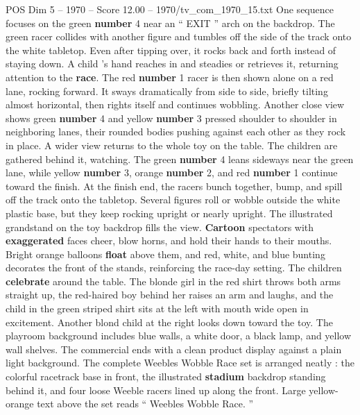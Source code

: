 \begin{textsample}{POS Dim 5 – 1970 – Score 12.00 – 1970/tv\_com\_1970\_15.txt}
One sequence focuses on the green \textbf{number} 4 near an “ EXIT ” arch on the backdrop.
The green racer collides with another figure and tumbles off the side of the track onto the white tabletop.
Even after tipping over, it rocks back and forth instead of staying down.
A child ’s hand reaches in and steadies or retrieves it, returning attention to the \textbf{race}.
The red \textbf{number} 1 racer is then shown alone on a red lane, rocking forward.
It sways dramatically from side to side, briefly tilting almost horizontal, then rights itself and continues wobbling.
Another close view shows green \textbf{number} 4 and yellow \textbf{number} 3 pressed shoulder to shoulder in neighboring lanes, their rounded bodies pushing against each other as they rock in place.
A wider view returns to the whole toy on the table.
The children are gathered behind it, watching.
The green \textbf{number} 4 leans sideways near the green lane, while yellow \textbf{number} 3, orange \textbf{number} 2, and red \textbf{number} 1 continue toward the finish.
At the finish end, the racers bunch together, bump, and spill off the track onto the tabletop.
Several figures roll or wobble outside the white plastic base, but they keep rocking upright or nearly upright.
The illustrated grandstand on the toy backdrop fills the view. \textbf{Cartoon} spectators with \textbf{exaggerated} faces cheer, blow horns, and hold their hands to their mouths.
Bright orange balloons \textbf{float} above them, and red, white, and blue bunting decorates the front of the stands, reinforcing the race-day setting.
The children \textbf{celebrate} around the table.
The blonde girl in the red shirt throws both arms straight up, the red-haired boy behind her raises an arm and laughs, and the child in the green striped shirt sits at the left with mouth wide open in excitement.
Another blond child at the right looks down toward the toy.
The playroom background includes blue walls, a white door, a black lamp, and yellow wall shelves.
The commercial ends with a clean product display against a plain light background.
The complete Weebles Wobble Race set is arranged neatly : the colorful racetrack base in front, the illustrated \textbf{stadium} backdrop standing behind it, and four loose Weeble racers lined up along the front.
Large yellow-orange text above the set reads “ Weebles Wobble Race. ”

\end{textsample}
